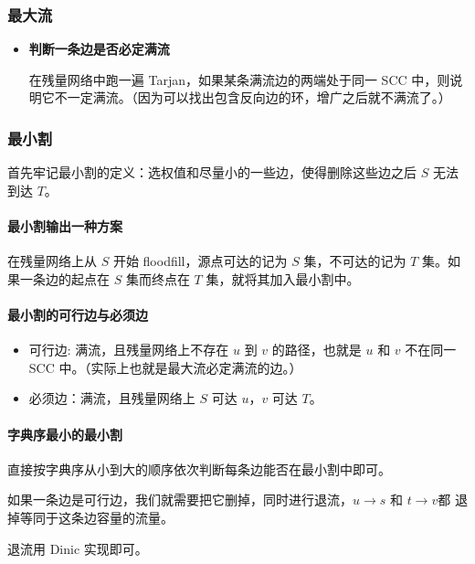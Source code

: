 \subsubsection{最大流}

\begin{itemize}

\item \textbf{判断一条边是否必定满流}

在残量网络中跑一遍 Tarjan，如果某条满流边的两端处于同一 SCC 中，则说明它不一定满流。（因为可以找出包含反向边的环，增广之后就不满流了。）

\end{itemize}

\subsubsection{最小割}

首先牢记最小割的定义：选权值和尽量小的一些边，使得删除这些边之后 $S$ 无法到达 $T$。

\paragraph{最小割输出一种方案}
在残量网络上从 $S$ 开始 floodfill，源点可达的记为 $S$ 集，不可达的记为 $T$ 集。如果一条边的起点在 $S$ 集而终点在 $T$ 集，就将其加入最小割中。

\paragraph{最小割的可行边与必须边}
\begin{itemize}
	\item 可行边: 满流，且残量网络上不存在 $u$ 到 $v$ 的路径，也就是 $u$ 和 $v$ 不在同一 SCC 中。（实际上也就是最大流必定满流的边。）

	\item 必须边：满流，且残量网络上 $S$ 可达 $u$，$v$ 可达 $T$。
\end{itemize}

\paragraph{字典序最小的最小割}
直接按字典序从小到大的顺序依次判断每条边能否在最小割中即可。

如果一条边是可行边，我们就需要把它删掉，同时进行退流，$u\to s$ 和 $t\to v$都 退掉等同于这条边容量的流量。

退流用 Dinic 实现即可。


